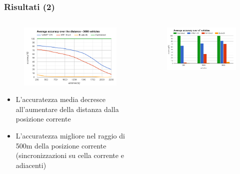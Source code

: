 \documentclass{beamer}
\begin{document}
\begin{frame}[shrink=40]
  \frametitle{Risultati (2)}
  \begin{columns}
    \begin{column}{0.45\textwidth}
      \vspace{20mm}
      \begin{figure}
      \includegraphics[width=\columnwidth]{img/graphics/distance.png}
      \end{figure}
      \begin{itemize}
	\item  L'accuratezza media decresce all'aumentare della distanza dalla posizione corrente
	\item  L'accuratezza migliore nel raggio di 500m della posizione corrente (sincronizzazioni su cella corrente e adiacenti)
      \end{itemize}
    \end{column}
    \begin{column}{0.45\textwidth}
      \vspace{10mm}
      \begin{figure}
      \includegraphics[width=\columnwidth]{img/graphics/n_car.png}

\end{figure}
\end{column}
\end{columns}
\end{frame}
\end{document}
